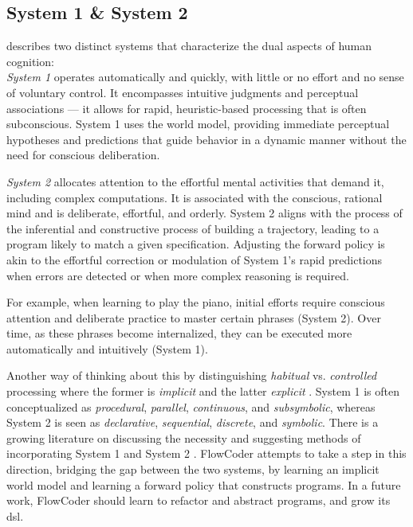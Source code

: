 \subsection{System 1 \& System 2}
\citet{Kahneman11} describes two distinct systems that characterize the dual aspects of human cognition: \\
\emph{System 1} operates automatically and quickly, with little or no effort and no sense of voluntary control. It encompasses intuitive judgments and perceptual associations — it allows for rapid, heuristic-based processing that is often subconscious.
System 1 uses the world model, providing immediate perceptual hypotheses and predictions that guide behavior in a dynamic manner without the need for conscious deliberation.

\emph{System 2} allocates attention to the effortful mental activities that demand it, including complex computations. It is associated with the conscious, rational mind and is deliberate, effortful, and orderly. 
System 2 aligns with the process of the inferential and constructive process of building a trajectory, leading to a program likely to match a given specification.
Adjusting the forward policy is akin to the effortful correction or modulation of System 1's rapid predictions when errors are detected or when more complex reasoning is required.

For example, when learning to play the piano, initial efforts require conscious attention and deliberate practice to master certain phrases (System 2). Over time, as these phrases become internalized, they can be executed more automatically and intuitively (System 1).

Another way of thinking about this by distinguishing \emph{habitual} vs. \emph{controlled} processing where the former is \emph{implicit} and the latter \emph{explicit} \cite{goyalInductiveBiasesDeep2022}.
System 1 is often conceptualized as \emph{procedural}, \emph{parallel}, \emph{continuous}, and \emph{subsymbolic}, whereas System 2 is seen as \emph{declarative}, \emph{sequential}, \emph{discrete}, and \emph{symbolic}. 
There is a growing literature on discussing the necessity and suggesting methods of incorporating System 1 and System 2 \cite{liuDiscreteValuedNeuralCommunication2021,cartuyvelsDiscreteContinuousRepresentations2021,nyeImprovingCoherenceConsistency2021,lecun2022path,matsuoDeepLearningReinforcement2022}.
FlowCoder attempts to take a step in this direction, bridging the gap between the two systems, by learning an implicit world model and learning a forward policy that constructs programs. In a future work, FlowCoder should learn to refactor and abstract programs, and grow its \acrlong{dsl}.








